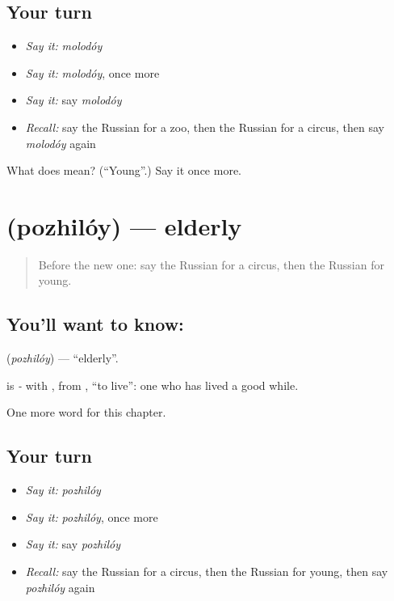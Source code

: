 \subsection*{Your turn}
\begin{itemize}
\raggedright
  \item \emph{Say it:} \emph{molodóy}
  \item \emph{Say it:} \emph{molodóy}, once more
  \item \emph{Say it:} say \emph{molodóy}
  \item \emph{Recall:} say the Russian for a zoo, then the Russian for a circus, then say \emph{molodóy} again
\end{itemize}

\begin{tcolorbox}[breakable,colback=teal!4,colframe=teal!35!black,title={Before you move on}]
What does  mean? (\textquotedblleft{}Young\textquotedblright{}.) Say it once more.
\end{tcolorbox}
\section[\texorpdfstring{\ru{пожилой} (pozhilóy)}{пожилой (pozhilóy)}]{ (pozhilóy) — elderly}

\label{lesson:RU-C243-pozhiloy}



\begin{quote}
Before the new one: say the Russian for a circus, then the Russian for young.
\end{quote}

\subsection*{You'll want to know: }
\textbf{} (\emph{pozhilóy}) — \textquotedblleft{}elderly\textquotedblright{}.

\begin{cousinweb}
\textbf{} is \emph{-} with \emph{}, from \emph{}, \textquotedblleft{}to live\textquotedblright{}: one who has lived a good while.
\end{cousinweb}

\begin{grammarlens}[title={What you've built}]
One more word for this chapter.
\end{grammarlens}

\subsection*{Your turn}
\begin{itemize}
\raggedright
  \item \emph{Say it:} \emph{pozhilóy}
  \item \emph{Say it:} \emph{pozhilóy}, once more
  \item \emph{Say it:} say \emph{pozhilóy}
  \item \emph{Recall:} say the Russian for a circus, then the Russian for young, then say \emph{pozhilóy} again
\end{itemize}

